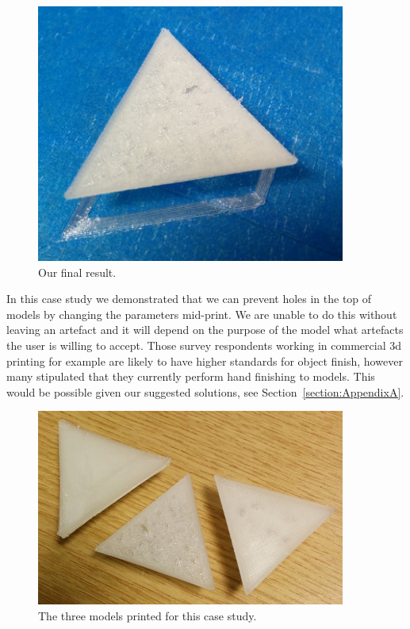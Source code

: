 \documentclass[pdftex, 11pt]{report} %
\begin{document}
\begin{figure}[H]
  \centering
  \includegraphics[width=4in]{PyramidOld1.png}
  \caption{Our final result.}
  \label{figure:PyramidNew2}
\end{figure}

In this case study we demonstrated that we can prevent holes in the top of models by changing the parameters mid-print. We are unable to do this without leaving an artefact and it will depend on the purpose of the model what artefacts the user is willing to accept. Those survey respondents working in commercial 3d printing for example are likely to have higher standards for object finish, however many stipulated that they currently perform hand finishing to models. This would be possible given our suggested solutions, see Section~\ref{section:AppendixA}.

\begin{figure}[H]
  \centering
  \includegraphics[width=4in]{PyramidsAll.png}
  \caption{The three models printed for this case study.}
  \label{figure:PyramidsAll}
\end{figure}
\end{document}
